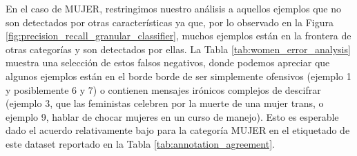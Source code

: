 En el caso de MUJER, restringimos nuestro análisis a aquellos ejemplos que no son detectados por otras características ya que, por lo observado en la Figura \ref{fig:precision_recall_granular_classifier}, muchos ejemplos están en la frontera de otras categorías y son detectados por ellas. La Tabla \ref{tab:women_error_analysis} muestra una selección de estos falsos negativos, donde podemos apreciar que algunos ejemplos están en el borde borde de ser simplemente ofensivos (ejemplo 1 y posiblemente 6 y 7) o contienen mensajes irónicos complejos de descifrar (ejemplo 3, que las feministas celebren por la muerte de una mujer trans, o ejemplo 9, hablar de chocar mujeres en un curso de manejo). Esto es esperable dado el acuerdo relativamente bajo para la categoría MUJER en el etiquetado de este dataset reportado en la Tabla \ref{tab:annotation_agreement}.




